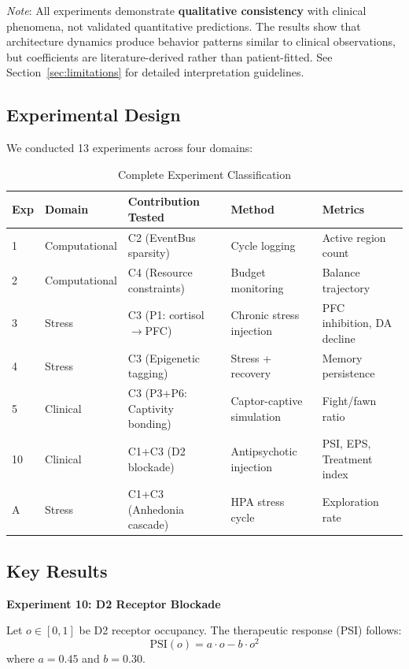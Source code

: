 \documentclass[preprint,12pt]{elsarticle}
\begin{document}
\textit{Note}: All experiments demonstrate \textbf{qualitative consistency} with clinical phenomena, not validated quantitative predictions. The results show that architecture dynamics produce behavior patterns similar to clinical observations, but coefficients are literature-derived rather than patient-fitted. See Section~\ref{sec:limitations} for detailed interpretation guidelines.

\subsection{Experimental Design}

We conducted 13 experiments across four domains:

\begin{table}[htbp]
\centering
\caption{Complete Experiment Classification}
\label{tab:experiments}
\begin{tabular}{lllll}
\toprule
\textbf{Exp} & \textbf{Domain} & \textbf{Contribution Tested} & \textbf{Method} & \textbf{Metrics} \\
\midrule
1 & Computational & C2 (EventBus sparsity) & Cycle logging & Active region count \\
2 & Computational & C4 (Resource constraints) & Budget monitoring & Balance trajectory \\
3 & Stress & C3 (P1: cortisol$\rightarrow$PFC) & Chronic stress injection & PFC inhibition, DA decline \\
4 & Stress & C3 (Epigenetic tagging) & Stress + recovery & Memory persistence \\
5 & Clinical & C3 (P3+P6: Captivity bonding) & Captor-captive simulation & Fight/fawn ratio \\
10 & Clinical & C1+C3 (D2 blockade) & Antipsychotic injection & PSI, EPS, Treatment index \\
A & Stress & C1+C3 (Anhedonia cascade) & HPA stress cycle & Exploration rate \\
\bottomrule
\end{tabular}
\end{table}

\subsection{Key Results}

\textbf{Experiment 10: D2 Receptor Blockade}

\begin{definition}
Let $o \in [0, 1]$ be D2 receptor occupancy. The therapeutic response (PSI) follows:
\begin{equation}
\text{PSI}(o) = a \cdot o - b \cdot o^2
\end{equation}
where $a = 0.45$ and $b = 0.30$.
\end{definition}
\end{document}
